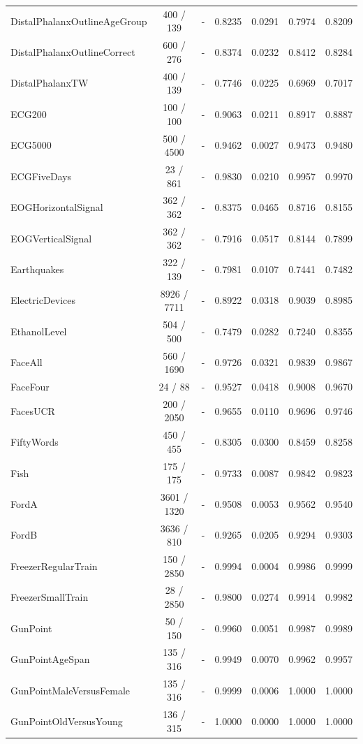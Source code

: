 \begin{longtable}{lcccccc}
DistalPhalanxOutlineAgeGroup & 400 / 139 & - & 0.8235 & 0.0291 & 0.7974 & 0.8209 \\
DistalPhalanxOutlineCorrect & 600 / 276 & - & 0.8374 & 0.0232 & 0.8412 & 0.8284 \\
DistalPhalanxTW & 400 / 139 & - & 0.7746 & 0.0225 & 0.6969 & 0.7017 \\
ECG200 & 100 / 100 & - & 0.9063 & 0.0211 & 0.8917 & 0.8887 \\
ECG5000 & 500 / 4500 & - & 0.9462 & 0.0027 & 0.9473 & 0.9480 \\
ECGFiveDays & 23 / 861 & - & 0.9830 & 0.0210 & 0.9957 & 0.9970 \\
EOGHorizontalSignal & 362 / 362 & - & 0.8375 & 0.0465 & 0.8716 & 0.8155 \\
EOGVerticalSignal & 362 / 362 & - & 0.7916 & 0.0517 & 0.8144 & 0.7899 \\
Earthquakes & 322 / 139 & - & 0.7981 & 0.0107 & 0.7441 & 0.7482 \\
ElectricDevices & 8926 / 7711 & - & 0.8922 & 0.0318 & 0.9039 & 0.8985 \\
EthanolLevel & 504 / 500 & - & 0.7479 & 0.0282 & 0.7240 & 0.8355 \\
FaceAll & 560 / 1690 & - & 0.9726 & 0.0321 & 0.9839 & 0.9867 \\
FaceFour & 24 / 88 & - & 0.9527 & 0.0418 & 0.9008 & 0.9670 \\
FacesUCR & 200 / 2050 & - & 0.9655 & 0.0110 & 0.9696 & 0.9746 \\
FiftyWords & 450 / 455 & - & 0.8305 & 0.0300 & 0.8459 & 0.8258 \\
Fish & 175 / 175 & - & 0.9733 & 0.0087 & 0.9842 & 0.9823 \\
FordA & 3601 / 1320 & - & 0.9508 & 0.0053 & 0.9562 & 0.9540 \\
FordB & 3636 / 810 & - & 0.9265 & 0.0205 & 0.9294 & 0.9303 \\
FreezerRegularTrain & 150 / 2850 & - & 0.9994 & 0.0004 & 0.9986 & 0.9999 \\
FreezerSmallTrain & 28 / 2850 & - & 0.9800 & 0.0274 & 0.9914 & 0.9982 \\
GunPoint & 50 / 150 & - & 0.9960 & 0.0051 & 0.9987 & 0.9989 \\
GunPointAgeSpan & 135 / 316 & - & 0.9949 & 0.0070 & 0.9962 & 0.9957 \\
GunPointMaleVersusFemale & 135 / 316 & - & 0.9999 & 0.0006 & 1.0000 & 1.0000 \\
GunPointOldVersusYoung & 136 / 315 & - & 1.0000 & 0.0000 & 1.0000 & 1.0000 \\

\end{longtable}
